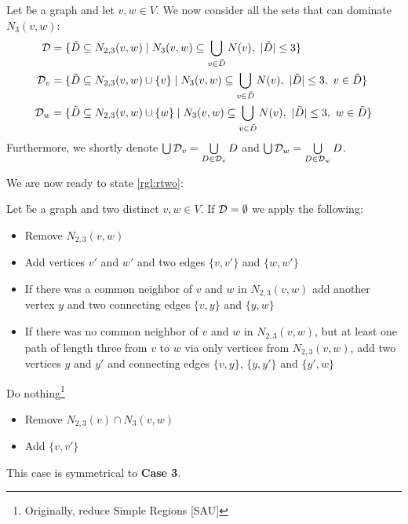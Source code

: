 \begin{definition}
Let \G be a graph and let $v,w \in V$. We now consider all the sets that can dominate $N_3(v,w)$:
\begin{align}
    \mathcal{D} & = \{ \tilde D \subseteq N_{2,3}(v,w)            \mid N_3(v,w) \subseteq \bigcup_{v \in \tilde D} N(v),\ |\tilde D| \leq 3                  \} \\
    \mathcal{D}_{v}  & = \{ \tilde D \subseteq N_{2,3}(v,w) \cup \{v\} \mid N_3(v,w) \subseteq \bigcup_{v \in \tilde D} N(v),\ |\tilde D| \leq 3,\ v \in \tilde D \} \\
    \mathcal{D}_{w}  & = \{ \tilde D \subseteq N_{2,3}(v,w) \cup \{w\} \mid N_3(v,w) \subseteq \bigcup_{v \in \tilde D} N(v),\ |\tilde D| \leq 3,\ w \in \tilde D \}
\end{align}
Furthermore, we shortly denote $\bigcup \mathcal{D}_{v} = \bigcup\limits_{D \in \mathcal{D}_{v}}D $ and $\bigcup \mathcal{D}_{w} = \bigcup\limits_{D \in \mathcal{D}_{w}}D$.
\end{definition}

\noindent We are now ready to state \cref{rgl:rtwo}:

\begin{rgl}\label{rgl:rtwo}
    Let \G be a graph and two distinct $v,w \in V$. If $\mathbf{\mathcal{D} = \emptyset}$ we apply the following:
    \begin{caseof}
        
        \vspace{-5mm}
        \begin{itemize}
            \item Remove $N_{2,3}(v,w)$
            \item Add vertices $v'$ and $w'$ and two edges $\{v, v'\}$ and $\{w, w'\}$
            \item If there was a common neighbor of $v$ and $w$ in $N_{2,3}(v,w)$ add another vertex $y$ and two connecting edges  $\{v, y\}$ and $\{y, w\}$
            \item If there was no common neighbor of $v$ and $w$ in $N_{2,3}(v,w)$, but at least one path of length three from $v$ to $w$ via only vertices from $N_{2,3}(v,w)$, add two vertices $y$ and $y'$ and connecting edges $\{v,y\}$, $\{y, y'\}$ and $\{y', w\}$
        \end{itemize}

        Do nothing\footnote{Originally, reduce Simple Regions [SAU]}
        
        
        \vspace{-5mm}
        \begin{itemize}
            \item Remove $N_{2,3}(v) \cap N_3(v,w)$
            \item Add $\{v, v'\}$
        \end{itemize}
        
         This case is symmetrical to \textbf{Case 3}. 
    \end{caseof}
\end{rgl}

